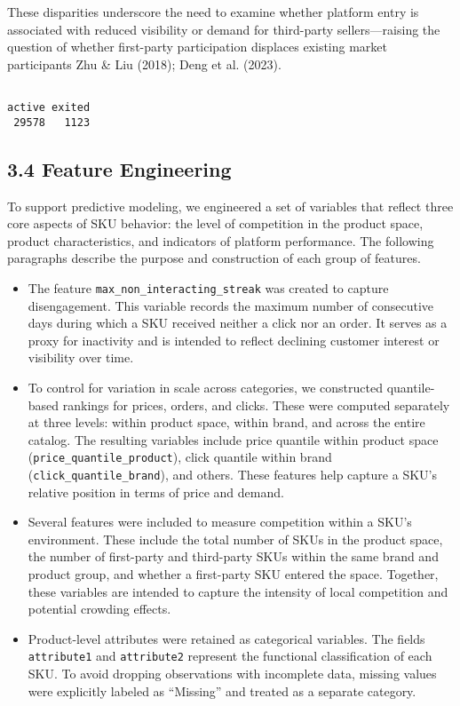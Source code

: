 \documentclass[
  letterpaper,
  DIV=11,
  numbers=noendperiod]{scrartcl}
\begin{document}
These disparities underscore the need to examine whether platform entry
is associated with reduced visibility or demand for third-party
sellers---raising the question of whether first-party participation
displaces existing market participants Zhu \& Liu (2018); Deng et al.
(2023).

\begin{verbatim}

active exited 
 29578   1123 
\end{verbatim}

\subsection{3.4 Feature Engineering}\label{feature-engineering}

To support predictive modeling, we engineered a set of variables that
reflect three core aspects of SKU behavior: the level of competition in
the product space, product characteristics, and indicators of platform
performance. The following paragraphs describe the purpose and
construction of each group of features.

\begin{itemize}
\item
  The feature \texttt{max\_non\_interacting\_streak} was created to
  capture disengagement. This variable records the maximum number of
  consecutive days during which a SKU received neither a click nor an
  order. It serves as a proxy for inactivity and is intended to reflect
  declining customer interest or visibility over time.
\item
  To control for variation in scale across categories, we constructed
  quantile-based rankings for prices, orders, and clicks. These were
  computed separately at three levels: within product space, within
  brand, and across the entire catalog. The resulting variables include
  price quantile within product space
  (\texttt{price\_quantile\_product}), click quantile within brand
  (\texttt{click\_quantile\_brand}), and others. These features help
  capture a SKU's relative position in terms of price and demand.
\item
  Several features were included to measure competition within a SKU's
  environment. These include the total number of SKUs in the product
  space, the number of first-party and third-party SKUs within the same
  brand and product group, and whether a first-party SKU entered the
  space. Together, these variables are intended to capture the intensity
  of local competition and potential crowding effects.
\item
  Product-level attributes were retained as categorical variables. The
  fields \texttt{attribute1} and \texttt{attribute2} represent the
  functional classification of each SKU. To avoid dropping observations
  with incomplete data, missing values were explicitly labeled as
  ``Missing'' and treated as a separate category.
\end{itemize}
\end{document}
